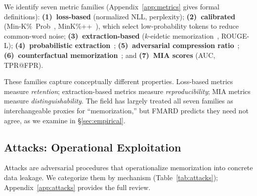 \documentclass[11pt]{article}
\begin{document}
We identify seven metric families (Appendix~\ref{app:metrics} gives formal
definitions):
\textbf{(1)~loss-based} (normalized NLL, perplexity);
\textbf{(2)~calibrated} (Min-K\%~Prob~\citep{shi2023detecting},
MinK\%++~\citep{zhang2025minkpp}), which select low-probability tokens to
reduce common-word noise;
\textbf{(3)~extraction-based} ($k$-eidetic
memorization~\citep{carlini2023quantifyingmemorizationneurallanguage},
ROUGE-L);
\textbf{(4)~probabilistic
extraction}~\citep{hayes2025measuringmemorizationlanguagemodels};
\textbf{(5)~adversarial compression ratio}~\citep{schwarzschild2024rethinking};
\textbf{(6)~counterfactual
memorization}~\citep{zhang2023counterfactual}; and
\textbf{(7)~MIA scores} (AUC, TPR@FPR).

These families capture conceptually different properties.
Loss-based metrics measure \textit{retention}; extraction-based metrics
measure \textit{reproducibility}; MIA metrics measure
\textit{distinguishability}.
The field has largely treated all seven families as interchangeable proxies
for ``memorization,'' but FMARD predicts they need not agree, as we examine
in \S\ref{sec:empirical}.


\subsection{Attacks: Operational Exploitation}
\label{sec:attacks}

Attacks are adversarial procedures that operationalize memorization into
concrete data leakage.
We categorize them by mechanism (Table~\ref{tab:attacks});
Appendix~\ref{app:attacks} provides the full review.
\end{document}
